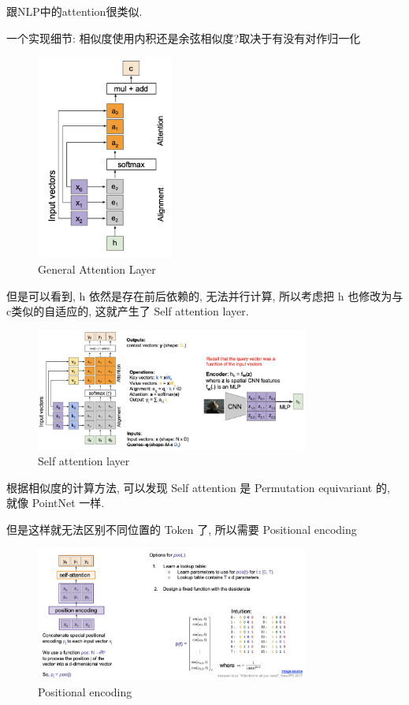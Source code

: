 跟NLP中的attention很类似.

一个实现细节: 相似度使用内积还是余弦相似度?取决于有没有对作归一化

\begin{figure}[htbp]
    \centering
    \includegraphics[width=0.4\textwidth]{figures/general_atten.png}
    \caption{General Attention Layer}
    \label{fig:general_atten}
\end{figure}

但是可以看到, h 依然是存在前后依赖的, 无法并行计算, 所以考虑把 h 也修改为与c类似的自适应的, 这就产生了 Self attention layer.

\begin{figure}[htbp]
    \centering
    \includegraphics[width=0.8\textwidth]{figures/paralle_q.png}
    \caption{Self attention layer}
    \label{fig:paralle_q}
\end{figure}

根据相似度的计算方法, 可以发现 Self attention 是 Permutation equivariant 的, 就像 PointNet 一样.

但是这样就无法区别不同位置的 Token 了, 所以需要 Positional encoding

\begin{figure}[htbp]
    \centering
    \includegraphics[width=0.8\textwidth]{figures/pos_encoding.png}
    \caption{Positional encoding}
    \label{fig:pos_encoding}
\end{figure}

